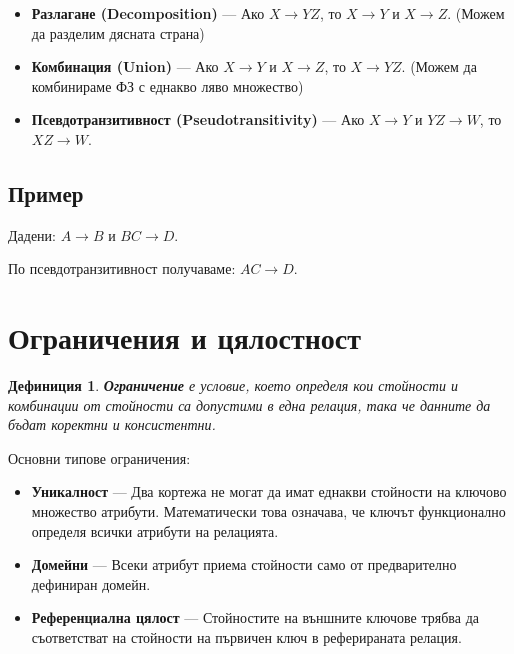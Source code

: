 \documentclass{scrartcl}
\newtheorem{definition}{Дефиниция}
\begin{document}
\begin{FlushLeft}
\begin{itemize}
    \item \textbf{Разлагане (Decomposition)} --- Ако $X \rightarrow YZ$, то $X \rightarrow Y$ и $X \rightarrow Z$. (Можем да разделим дясната страна)
    
    \item \textbf{Комбинация (Union)} --- Ако $X \rightarrow Y$ и $X \rightarrow Z$, то $X \rightarrow YZ$. (Можем да комбинираме ФЗ с еднакво ляво множество)
    
    \item \textbf{Псевдотранзитивност (Pseudotransitivity)} --- Ако $X \rightarrow Y$ и $YZ \rightarrow W$, то $XZ \rightarrow W$.
\end{itemize}

\subsection{Пример}

Дадени: $A \rightarrow B$ и $BC \rightarrow D$.

По псевдотранзитивност получаваме: $AC \rightarrow D$.

\section{Ограничения и цялостност}

\begin{definition}
\textbf{\textit{Ограничение}} е условие, което определя кои стойности и комбинации от стойности са допустими в една релация, така че данните да бъдат коректни и консистентни.
\end{definition}

Основни типове ограничения:

\begin{itemize}
    \item \textbf{Уникалност} --- Два кортежа не могат да имат еднакви стойности на ключово множество атрибути. Математически това означава, че ключът функционално определя всички атрибути на релацията.
    
    \item \textbf{Домейни} --- Всеки атрибут приема стойности само от предварително дефиниран домейн.
    
    \item \textbf{Референциална цялост} --- Стойностите на външните ключове трябва да съответстват на стойности на първичен ключ в реферираната релация.
\end{itemize}


\end{FlushLeft}
\end{document}
